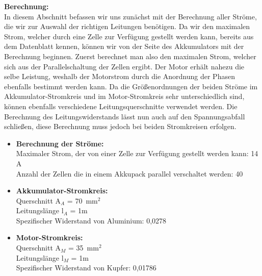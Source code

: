 \textbf{Berechnung:} 
\\[2mm]
In diesem Abschnitt befassen wir uns zunächst mit der Berechnung aller Ströme, die wir zur Auswahl der richtigen Leitungen benötigen. Da wir den maximalen Strom, welcher durch eine Zelle zur Verfügung gestellt werden kann, bereits aus dem Datenblatt kennen, können wir von der Seite des Akkumulators mit der Berechnung beginnen. Zuerst berechnet man also den maximalen Strom, welcher sich aus der Parallelschaltung der Zellen ergibt. Der Motor erhält nahezu die selbe Leistung, weshalb der Motorstrom durch die Anordnung der Phasen ebenfalls bestimmt werden kann. Da die Größenordnungen der beiden Ströme im Akkumulator-Stromkreis und im Motor-Stromkreis sehr unterschiedlich sind, können ebenfalls verschiedene Leitungsquerschnitte verwendet werden. Die Berechnung des Leitungswiderstands lässt nun auch auf den Spannungsabfall schließen, diese Berechnung muss jedoch bei beiden Stromkreisen erfolgen.\\[6mm]
\begin{itemize}
	\item \textbf{Berechnung der Ströme:}
	\\[1mm] Maximaler Strom, der von einer Zelle zur Verfügung gestellt werden kann: 14 A 
	\\ Anzahl der Zellen die in einem Akkupack parallel verschaltet werden: 40 \\[3mm]
	\item \textbf{Akkumulator-Stromkreis:} 
	\\[1mm] Querschnitt    A$_A$ =  70~mm$^2$
	\\ Leitungslänge  l$_A$ =  1m  		
	\\ Spezifischer Widerstand von Aluminium: 	0,0278 \\[3mm]
	\item \textbf{Motor-Stromkreis:}
	\\[1mm] Querschnitt    A$_M$ =  35~mm$^2$
	\\ Leitungslänge  l$_M$ =  1m  		
	\\ Spezifischer Widerstand von Kupfer:		0,01786
\end{itemize}

